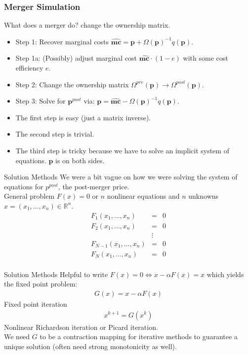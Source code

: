 \documentclass[xcolor=pdftex,dvipsnames,table,mathserif,aspectratio=169]{beamer}
\begin{document}
\begin{frame}
\frametitle{Merger Simulation}
What does a merger do? \alert{change the ownership matrix}.
\begin{itemize}

\item Step 1: Recover marginal costs $\widehat{\mathbf{mc}} = \mathbf{p} +\Omega(\mathbf{p})^{-1}q(\mathbf{p})$.
\item Step 1a: (Possibly) adjust marginal cost $\widehat{\mathbf{mc}}\cdot (1-e)$ with some cost efficiency $e$.
\item Step 2: Change the ownership matrix $\Omega^{pre}(\mathbf{p}) \rightarrow \Omega^{post}(\mathbf{p})$.
\item Step 3: Solve for $\mathbf{p}^{post}$ via: $\mathbf{p} = \widehat{\mathbf{mc}} - \Omega(\mathbf{p})^{-1}q(\mathbf{p})$.
\end{itemize}
\pause
\vspace{0.5cm}
\begin{itemize}
\item The first step is easy (just a matrix inverse).
\item The second step is trivial.
\item The third step is tricky because we have to solve an implicit system of equations. $\mathbf{p}$ is on both sides.
\end{itemize}
\end{frame}




\begin{frame}{Solution Methods}
We were a bit vague on how we were solving the system of equations for $p^{post}$, the post-merger price.\\

\vspace{0.5cm}
General problem $F(x) = 0$ or $n$ nonlinear equations and $n$ unknowns $x = (x_1,\ldots, x_n) \in \mathbb{R}^n$.
\begin{eqnarray*}
F_1 (x_1,\ldots, x_n)  &=& 0 \\
F_2 (x_1,\ldots, x_n)  &=& 0\\
&\vdots&\\ 
F_{N-1} (x_1,\ldots, x_n)  &=& 0\\
F_N (x_1,\ldots, x_n)  &=& 0\\
\end{eqnarray*}
\end{frame} 

\begin{frame}{Solution Methods}
Helpful to write $F(x) = 0 \Leftrightarrow x - \alpha F(x) = x$ which yields the fixed point problem:
\begin{eqnarray*}
G(x) = x -\alpha F(x)
\end{eqnarray*}
Fixed point iteration
\begin{eqnarray*}
x^{k+1} = G(x^k)
\end{eqnarray*}
Nonlinear Richardson iteration or Picard iteration.\\
\vspace{0.5cm}
We need $G$ to be a \alert{contraction mapping} for iterative methods to guarantee a unique solution (often need strong monotonicity as well).
\end{frame} 
\end{document}
